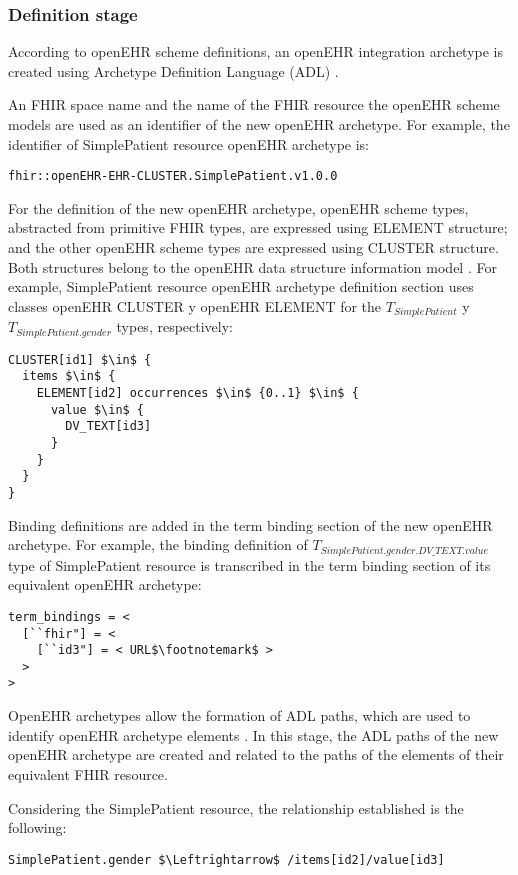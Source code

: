 \subsubsection{Definition stage}

According to openEHR scheme definitions, an open\-EHR integration archetype is created using Archetype Definition Language (ADL) \cite{openEHRADL}.

An FHIR space name and the name of the FHIR resource the openEHR scheme models are used as an identifier of the new openEHR archetype. For example, the identifier of SimplePatient resource openEHR archetype is:

\begin{lstlisting}
fhir::openEHR-EHR-CLUSTER.SimplePatient.v1.0.0
\end{lstlisting}

For the definition of the new openEHR archetype, open\-EHR scheme types, abstracted from primitive FHIR types, are expressed using ELEMENT structure; and the other openEHR scheme types are expressed using CLUSTER structure. Both structures belong to the openEHR data structure information model \cite{openEHRDataStructures}. For example, SimplePatient resource openEHR archetype definition section uses classes openEHR CLUSTER y openEHR ELEMENT for the \(T_{SimplePatient}\) y \(T_{SimplePatient.gender}\) types, respectively:

\begin{lstlisting}[mathescape=true]
CLUSTER[id1] $\in$ {
  items $\in$ {
    ELEMENT[id2] occurrences $\in$ {0..1} $\in$ {
      value $\in$ {
        DV_TEXT[id3]
      }
    }
  }
}
\end{lstlisting}

Binding definitions are added in the term binding section of the new openEHR archetype. For example, the binding definition of \(T_{SimplePatient.gender.DV\_TEXT.value}\) ty\-pe of SimplePatient resource is transcribed in the term binding section of its equivalent openEHR archetype:

\begin{lstlisting}[escapechar=$]
term_bindings = <
  [``fhir"] = <
    [``id3"] = < URL$\footnotemark$ >
  >
>
\end{lstlisting}


OpenEHR archetypes allow the formation of ADL paths, which are used to identify openEHR archetype elements  \cite{openEHRArchitecture}. In this stage, the ADL paths of the new openEHR archetype are created and related to the paths of the elements of their equivalent FHIR resource.

Considering the SimplePatient resource, the relationship established is the following:

\begin{lstlisting}[mathescape=true]
SimplePatient.gender $\Leftrightarrow$ /items[id2]/value[id3]
\end{lstlisting}
